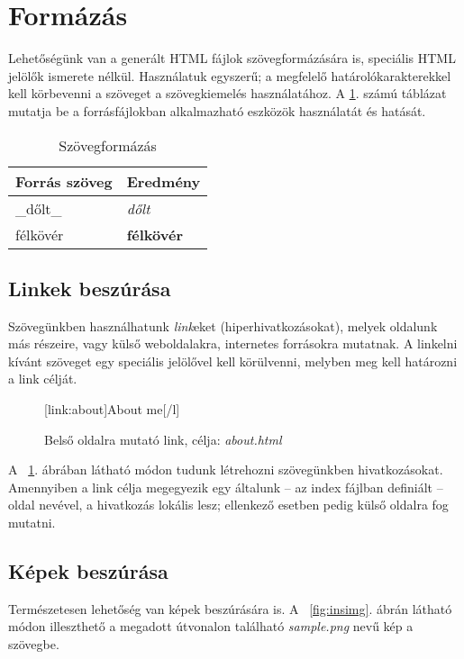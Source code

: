 \documentclass[a4paper,10pt]{article}
\begin{document}
\section{Formázás}
\label{sec:format}
Lehetőségünk van a generált HTML fájlok szövegformázására is, speciális HTML jelölők ismerete nélkül. Használatuk egyszerű; a megfelelő határolókarakterekkel kell körbevenni a szöveget a szövegkiemelés használatához. A \ref{table:textformat}. számú táblázat mutatja be a forrásfájlokban alkalmazható eszközök használatát és hatását.

\begin{table}[h!]
  \begin{center}
    \begin{tabular}{| l | l |}
    \hline
    Forrás szöveg & Eredmény \\
    \hline \hline
    \_dőlt\_ & \textit{dőlt} \\
    \hline
    \*félkövér\* & \textbf{félkövér} \\
    \hline
    \end{tabular}
  \end{center}
  \caption{Szövegformázás}
  \label{table:textformat}
\end{table}

\subsection{Linkek beszúrása}
Szövegünkben használhatunk \emph{link}eket (hiperhivatkozásokat), melyek oldalunk más részeire, vagy külső weboldalakra, internetes forrásokra mutatnak. A linkelni kívánt szöveget egy speciális jelölővel kell körülvenni, melyben meg kell határozni a link célját.

\begin{figure}[h]
	\begin{center}
		[link:about]About me[/l]
		\caption{Belső oldalra mutató link, célja: \emph{about.html}}
		\label{fig:loclink}
	\end{center}
\end{figure}

A ~\ref{fig:loclink}. ábrában látható módon tudunk létrehozni szövegünkben hivatkozásokat. Amennyiben a link célja megegyezik egy általunk -- az index fájlban definiált -- oldal nevével, a hivatkozás lokális lesz; ellenkező esetben pedig külső oldalra fog mutatni.

\subsection{Képek beszúrása}
Természetesen lehetőség van képek beszúrására is. A ~\ref{fig:insimg}. ábrán látható módon illeszthető a megadott útvonalon található \emph{sample.png} nevű kép a szövegbe.
\end{document}
